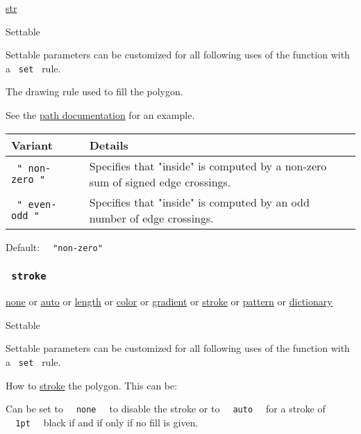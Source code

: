 \href{/docs/reference/foundations/str/}{str}

{{ Settable }}

\label{parameters-fill-rule-settable-tooltip}
Settable parameters can be customized for all following uses of the
function with a \texttt{\ set\ } rule.

The drawing rule used to fill the polygon.

See the
\href{/docs/reference/visualize/path/\#parameters-fill-rule}{path
documentation} for an example.

\begin{longtable}[]{@{}ll@{}}
\toprule\noalign{}
Variant & Details \\
\midrule\noalign{}
\endhead
\bottomrule\noalign{}
\endlastfoot
\texttt{\ "\ non-zero\ "\ } & Specifies that "inside" is computed by a
non-zero sum of signed edge crossings. \\
\texttt{\ "\ even-odd\ "\ } & Specifies that "inside" is computed by an
odd number of edge crossings. \\
\end{longtable}

Default: \texttt{\ }{\texttt{\ "non-zero"\ }}\texttt{\ }

\subsubsection{\texorpdfstring{\texttt{\ stroke\ }}{ stroke }}\label{parameters-stroke}

\href{/docs/reference/foundations/none/}{none} {or}
\href{/docs/reference/foundations/auto/}{auto} {or}
\href{/docs/reference/layout/length/}{length} {or}
\href{/docs/reference/visualize/color/}{color} {or}
\href{/docs/reference/visualize/gradient/}{gradient} {or}
\href{/docs/reference/visualize/stroke/}{stroke} {or}
\href{/docs/reference/visualize/pattern/}{pattern} {or}
\href{/docs/reference/foundations/dictionary/}{dictionary}

{{ Settable }}

\label{parameters-stroke-settable-tooltip}
Settable parameters can be customized for all following uses of the
function with a \texttt{\ set\ } rule.

How to \href{/docs/reference/visualize/stroke/}{stroke} the polygon.
This can be:

Can be set to \texttt{\ }{\texttt{\ none\ }}\texttt{\ } to disable the
stroke or to \texttt{\ }{\texttt{\ auto\ }}\texttt{\ } for a stroke of
\texttt{\ }{\texttt{\ 1pt\ }}\texttt{\ } black if and if only if no fill
is given.

